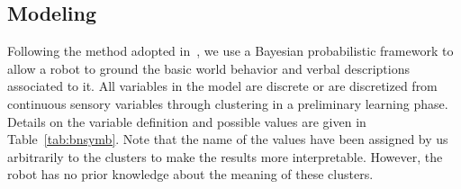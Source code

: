 \subsection{\AffWords{} Modeling}
\label{sec:bn}

Following the method adopted in~\cite{salvi:2012:smcb}, we use a Bayesian probabilistic framework to allow a robot to ground the basic world behavior and verbal descriptions associated to it.
All variables in the model are discrete or are discretized from continuous sensory variables through clustering in a preliminary learning phase.
Details on the variable definition and possible values are given in Table~\ref{tab:bnsymb}.
Note that the name of the values have been assigned by us arbitrarily to the clusters to make the results more interpretable.
However, the robot has no prior knowledge about the meaning of these clusters. 



